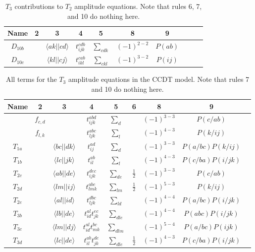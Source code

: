 	\begin{table}[h]
		\centering
		\caption{$T_3$ contributions to $T_2$ amplitude equations. Note that rules 6, 7, and 10 do nothing here.}
		\begin{tabular}{cccccccccc}
			Name & 2 & 3 & 4 & 5 & 8 & 9 & \\ \hline
			$D_{10b}$ & & $\langle ak||cd \rangle$ & $t_{ijk}^{cdb}$ & $\sum_{cdk}$ & $(-1)^{2-2}$ & $P(ab)$ &\\
			$D_{10c}$ & & $\langle kl||cj \rangle$ & $t_{ikl}^{cab}$ & $\sum_{ckl}$ & $(-1)^{3-2}$ & $P(ij)$ &\\ \hline
		\end{tabular}
		\label{CC | table | "CCDT T2 amp eq derivation"}
	\end{table}
	
	\begin{table}[h]
		\centering
		\caption{All terms for the $T_3$ amplitude equations in the CCDT model. Note that rules 7 and 10 do nothing here.}
		\begin{tabular}{ccccccccc}
			Name & 2 & 3 & 4 & 5 & 6 & 8 & 9 & \\ \hline
			& $f_{c,d}$ & & $t_{ijk}^{abd}$ & $\sum_d$ & & $(-1)^{3-3}$ & $P(c/ab)$ & \\
			& $f_{l,k}$ & & $t_{ljk}^{abc}$ & $\sum_l$ & & $(-1)^{4-3}$ & $P(k/ij)$ & \\
			$T_{1a}$ & & $\langle bc||dk \rangle$ & $t_{ij}^{ad}$ & $\sum_{d}$ & & $(-1)^{3-3}$ & $P(a/bc)P(k/ij)$ &\\
			$T_{1b}$ & & $\langle lc||jk \rangle$ & $t_{il}^{ab}$ & $\sum_{l}$ & & $(-1)^{4-3}$ & $P(c/ba)P(i/jk)$ &\\
			$T_{2c}$ & & $\langle ab||de \rangle$ & $t_{ijk}^{dec}$ & $\sum_{de}$ & $\frac{1}{2}$ & $(-1)^{3-3}$ & $P(c/ab)$ &\\
			$T_{2d}$ & & $\langle lm||ij \rangle$ & $t_{lmk}^{abc}$ & $\sum_{lm}$ & $\frac{1}{2}$ & $(-1)^{5-3}$ & $P(k/ij)$ &\\
			$T_{2e}$ & & $\langle al||id \rangle$ & $t_{ljk}^{dbc}$ & $\sum_{ld}$ & & $(-1)^{4-4}$ & $P(a/bc)P(i/jk)$ &\\
			$T_{3b}$ & & $\langle lb||de \rangle$ & $t_{id}^{al}t_{jk}^{ec}$ & $\sum_{dle}$ & & $(-1)^{4-4}$ & $P(abc)P(i/jk)$ &\\
			$T_{3c}$ & & $\langle lm||dj \rangle$ & $t_{id}^{al}t_{mk}^{bc}$ & $\sum_{dlm}$ & & $(-1)^{5-4}$ & $P(a/bc)P(ijk)$ &\\
			$T_{3d}$ & & $\langle lc||de \rangle$ & $t_{il}^{ab}t_{jk}^{de}$ & $\sum_{dle}$ & $\frac{1}{2}$  & $(-1)^{4-3}$ & $P(c/ba)P(i/jk)$ &\\

\end{tabular}
\end{table}
